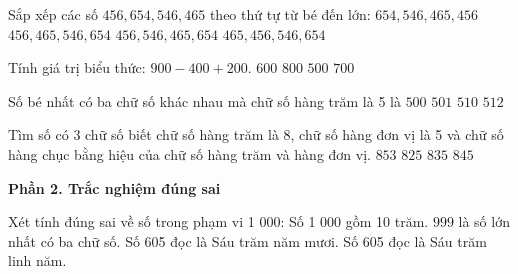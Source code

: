 \begin{ex} %
Sắp xếp các số $456, 654, 546, 465$ theo thứ tự từ bé đến lớn:
\choice
{$654, 546, 465, 456$}
{\True $456, 465, 546, 654$}
{$456, 546, 465, 654$}
{$465, 456, 546, 654$}
\end{ex}

\begin{ex} %
Tính giá trị biểu thức: $900 - 400 + 200$.
\choice
{$600$}
{$800$}
{$500$}
{\True $700$}
\end{ex}

\begin{ex} %
Số bé nhất có ba chữ số khác nhau mà chữ số hàng trăm là 5 là
\choice
{$500$}
{\True $501$}
{$510$}
{$512$}
\end{ex}

\begin{ex} %
Tìm số có 3 chữ số biết chữ số hàng trăm là 8, chữ số hàng đơn vị là 5 và chữ số hàng chục bằng hiệu của chữ số hàng trăm và hàng đơn vị.
\choice
{$853$}
{$825$}
{\True $835$}
{$845$}
\end{ex}

\textbf{Phần 2. Trắc nghiệm đúng sai}

\begin{ex} %
Xét tính đúng sai về số trong phạm vi 1 000:
\choiceTF
{\True Số 1 000 gồm 10 trăm.}
{\True $999$ là số lớn nhất có ba chữ số.}
{Số 605 đọc là Sáu trăm năm mươi.}
{\True Số 605 đọc là Sáu trăm linh năm.}
\end{ex}

